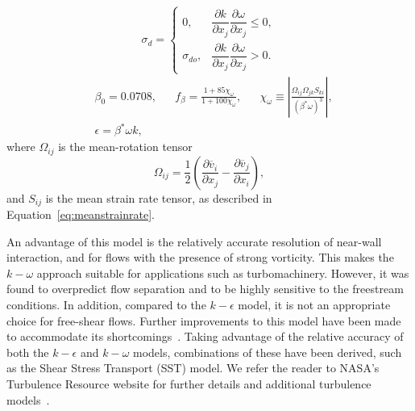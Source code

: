 \[
    \sigma_{d} = 
\begin{cases}
    0,  &\dfrac{\partial k}{\partial x_j} \dfrac{\partial\omega}{\partial x_j}  \leq 0, \\
    \sigma_{do}, &\dfrac{\partial k}{\partial x_j} \dfrac{\partial\omega}{\partial x_j} > 0.
\end{cases}
\]
\begin{align}
    & \beta_0 = 0.0708, & & f_\beta = \frac{1+85\chi_\omega}{1+100\chi_\omega}, & & \chi_\omega\equiv \left|\frac{\Omega_{ij}\Omega_{jk}S_{ki}}{\left(\beta^* \omega\right)^3}\right|, \\
    & \epsilon = \beta^* \omega k, 
\end{align}
where $\Omega_{ij}$ is the mean-rotation tensor
\begin{equation}
    \Omega_{ij} = \frac{1}{2} \left( \frac{\partial \overline v_i}{\partial x_j}
    -\frac{\partial \overline v_j}{\partial x_i}\right),
\end{equation}
and $S_{ij}$ is the mean strain rate tensor, as described in Equation~\ref{eq:meanstrainrate}.

An advantage of this model is the relatively accurate resolution of near-wall interaction, and for flows with the presence of strong vorticity. This makes the $k-\omega$ approach suitable for applications such as turbomachinery. However, it was found to overpredict flow separation and to be highly sensitive to the freestream conditions. In addition, compared to the $k-\epsilon$ model, it is not an appropriate choice for free-shear flows. Further improvements to this model have been made to accommodate its shortcomings~\cite{wilcox1998turbulence}. Taking advantage of the relative accuracy of both the $k-\epsilon$ and $k-\omega$ models, combinations of these have been derived, such as the Shear Stress Transport (SST) model. We refer the reader to NASA's Turbulence Resource website for further details and additional turbulence models~\cite{rumseyRecentDevelopmentsTurbulence2015}.

